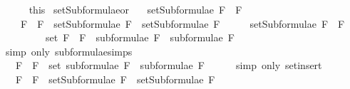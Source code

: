 \begin{isabellebody}
\ \ \ \ \isamarkupfalse%
\ this\isanewline
{}\isamarkupfalse%
%
\endisatagproof
{\isafoldproof}%
%
\isadelimproof
\isanewline
%
\endisadelimproof
\isanewline
{}\isamarkupfalse%
\ setSubformulae{\isacharunderscore}or{\isacharcolon}\ \isanewline
\ \ {\isachardoublequoteopen}setSubformulae\ {\isacharparenleft}F{}\ \isactrlbold {\isasymor}\ F{}{\isacharparenright}\ \isanewline
\ \ \ {\isacharequal}\ {\isacharbraceleft}F{}\ \isactrlbold {\isasymor}\ F{}{\isacharbraceright}\ {\isasymunion}\ {\isacharparenleft}setSubformulae\ F{}\ {\isasymunion}\ setSubformulae\ F{}{\isacharparenright}{\isachardoublequoteclose}\isanewline
%
\isadelimproof
%
\endisadelimproof
%
\isatagproof
{}\isamarkupfalse%
\ {\isacharminus}\isanewline
\ \ \isamarkupfalse%
\ {\isachardoublequoteopen}setSubformulae\ {\isacharparenleft}F{}\ \isactrlbold {\isasymor}\ F{}{\isacharparenright}\ \isanewline
\ \ \ \ \ \ \ \ {\isacharequal}\ set\ {\isacharparenleft}{\isacharparenleft}F{}\ \isactrlbold {\isasymor}\ F{}{\isacharparenright}\ {\isacharhash}\ {\isacharparenleft}subformulae\ F{}\ {\isacharat}\ subformulae\ F{}{\isacharparenright}{\isacharparenright}{\isachardoublequoteclose}\isanewline
\ \ \ \ \isamarkupfalse%
\ {\isacharparenleft}simp\ only{\isacharcolon}\ subformulae{\isachardot}simps{\isacharparenleft}{}{\isacharparenright}{\isacharparenright}\isanewline
\ \ \isamarkupfalse%
\ \isamarkupfalse%
\ {\isachardoublequoteopen}{\isasymdots}\ {\isacharequal}\ {\isacharbraceleft}F{}\ \isactrlbold {\isasymor}\ F{}{\isacharbraceright}\ {\isasymunion}\ {\isacharparenleft}set\ {\isacharparenleft}subformulae\ F{}\ {\isacharat}\ subformulae\ F{}{\isacharparenright}{\isacharparenright}{\isachardoublequoteclose}\isanewline
\ \ \ \ \isamarkupfalse%
\ {\isacharparenleft}simp\ only{\isacharcolon}\ set{\isacharunderscore}insert{\isacharparenright}\isanewline
\ \ \isamarkupfalse%
\ \isamarkupfalse%
\ {\isachardoublequoteopen}{\isasymdots}\ {\isacharequal}\ {\isacharbraceleft}F{}\ \isactrlbold {\isasymor}\ F{}{\isacharbraceright}\ {\isasymunion}\ {\isacharparenleft}setSubformulae\ F{}\ {\isasymunion}\ setSubformulae\ F{}{\isacharparenright}{\isachardoublequoteclose}\isanewline
\ \ \ \ \isamarkupfalse%

\end{isabellebody}
